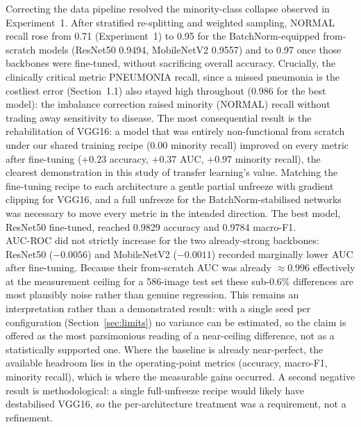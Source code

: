 \documentclass[11pt,a4paper]{article}
\numberwithin{figure}{section}
\numberwithin{table}{section}
\begin{document}
Correcting the data pipeline resolved the minority-class collapse observed in Experiment~1. After
stratified re-splitting and weighted sampling, NORMAL recall rose from 0.71 (Experiment~1) to 0.95 for
the BatchNorm-equipped from-scratch models (ResNet50 0.9494, MobileNetV2 0.9557) and to 0.97 once those
backbones were fine-tuned, without sacrificing overall accuracy. Crucially, the clinically critical
metric PNEUMONIA recall, since a missed pneumonia is the costliest error (Section~1.1) also stayed
high throughout (0.986 for the best model): the imbalance correction raised minority (NORMAL) recall
without trading away sensitivity to disease. The most consequential result is the rehabilitation of
VGG16: a model that was entirely non-functional from scratch under our shared training recipe (0.00
minority recall) improved on every metric after fine-tuning ($+0.23$ accuracy, $+0.37$ AUC, $+0.97$
minority recall), the clearest demonstration in this study of transfer learning's value. Matching the
fine-tuning recipe to each architecture a gentle partial unfreeze with gradient clipping for VGG16, and
a full unfreeze for the BatchNorm-stabilised networks was necessary to move every metric in the
intended direction. The best model, ResNet50 fine-tuned, reached 0.9829 accuracy and 0.9784 macro-F1.\\

AUC-ROC did not strictly increase for the two already-strong backbones: ResNet50 ($-0.0056$) and
MobileNetV2 ($-0.0011$) recorded marginally lower AUC after fine-tuning. Because their from-scratch AUC
was already $\approx0.996$ effectively at the measurement ceiling for a 586-image test set these
sub-0.6\% differences are most plausibly noise rather than genuine regression. This remains an
interpretation rather than a demonstrated result: with a single seed per configuration
(Section~\ref{sec:limits}) no variance can be estimated, so the claim is offered as the most parsimonious
reading of a near-ceiling difference, not as a statistically supported one. Where the baseline is already
near-perfect, the available headroom lies in the operating-point metrics (accuracy, macro-F1, minority
recall), which is where the measurable gains occurred. A second negative result is methodological: a
single full-unfreeze recipe would likely have destabilised VGG16, so the per-architecture treatment was a
requirement, not a refinement.\\
\end{document}
